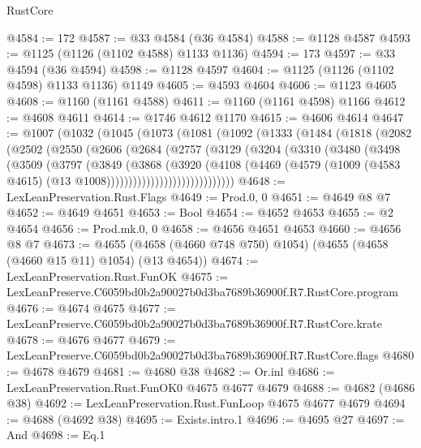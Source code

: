 \begin{lexlean}{RustCore}
\begin{coremodule}
@4584 := 172
@4587 := @33 @4584 (@36 @4584)
@4588 := @1128 @4587
@4593 := @1125 (@1126 (@1102 @4588) @1133 @1136)
@4594 := 173
@4597 := @33 @4594 (@36 @4594)
@4598 := @1128 @4597
@4604 := @1125 (@1126 (@1102 @4598) @1133 @1136) @1149
@4605 := @4593 @4604
@4606 := @1123 @4605
@4608 := @1160 (@1161 @4588)
@4611 := @1160 (@1161 @4598) @1166
@4612 := @4608 @4611
@4614 := @1746 @4612 @1170
@4615 := @4606 @4614
@4647 := @1007
    (@1032
      (@1045
        (@1073
          (@1081
            (@1092
              (@1333
                (@1484
                  (@1818
                    (@2082
                      (@2502
                        (@2550
                          (@2606
                            (@2684
                              (@2757
                                (@3129
                                  (@3204
                                    (@3310
                                      (@3480
                                        (@3498
                                          (@3509
                                            (@3797
                                              (@3849
                                                (@3868
                                                  (@3920
                                                    (@4108
                                                      (@4469
                                                        (@4579
                                                          (@1009
                                                            (@4583 @4615)
                                                            (@13 @1008)))))))))))))))))))))))))))))
@4648 := LexLeanPreservation.Rust.Flags
@4649 := Prod.{0, 0}
@4651 := @4649 @8 @7
@4652 := @4649 @4651
@4653 := Bool
@4654 := @4652 @4653
@4655 := @2 @4654
@4656 := Prod.mk.{0, 0}
@4658 := @4656 @4651 @4653
@4660 := @4656 @8 @7
@4673 := @4655 (@4658 (@4660 @748 @750) @1054) (@4655 (@4658 (@4660 @15 @11) @1054) (@13 @4654))
@4674 := LexLeanPreservation.Rust.FunOK
@4675 := LexLeanPreserve.C6059bd0b2a90027b0d3ba7689b36900f.R7.RustCore.program
@4676 := @4674 @4675
@4677 := LexLeanPreserve.C6059bd0b2a90027b0d3ba7689b36900f.R7.RustCore.krate
@4678 := @4676 @4677
@4679 := LexLeanPreserve.C6059bd0b2a90027b0d3ba7689b36900f.R7.RustCore.flags
@4680 := @4678 @4679
@4681 := @4680 @38
@4682 := Or.inl
@4686 := LexLeanPreservation.Rust.FunOK0 @4675 @4677 @4679
@4688 := @4682 (@4686 @38)
@4692 := LexLeanPreservation.Rust.FunLoop @4675 @4677 @4679
@4694 := @4688 (@4692 @38)
@4695 := Exists.intro.{1}
@4696 := @4695 @27
@4697 := And
@4698 := Eq.{1}

\end{coremodule}
\end{lexlean}
